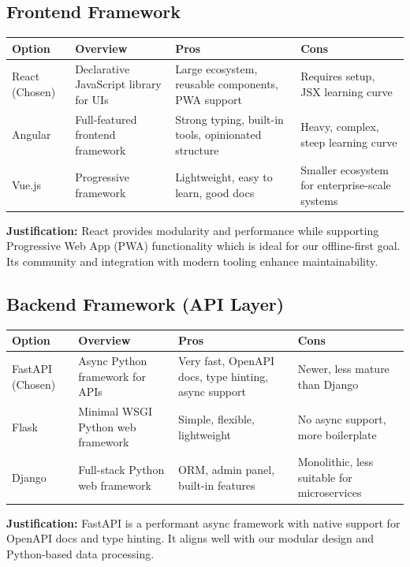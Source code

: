 \documentclass[12pt]{article}
\begin{document}
\subsection*{Frontend Framework}

\begin{tabular}{|p{3cm}|p{4cm}|p{4cm}|p{4cm}|}
\hline
\textbf{Option} & \textbf{Overview} & \textbf{Pros} & \textbf{Cons} \\
\hline
React (Chosen) & Declarative JavaScript library for UIs & Large ecosystem, reusable components, PWA support & Requires setup, JSX learning curve \\
\hline
Angular & Full-featured frontend framework & Strong typing, built-in tools, opinionated structure & Heavy, complex, steep learning curve \\
\hline
Vue.js & Progressive framework & Lightweight, easy to learn, good docs & Smaller ecosystem for enterprise-scale systems \\
\hline
\end{tabular}
\newline
\textbf{Justification:} React provides modularity and performance while supporting Progressive Web App (PWA) functionality which is ideal for our offline-first goal. Its community and integration with modern tooling enhance maintainability.

\subsection*{Backend Framework (API Layer)}

\begin{tabular}{|p{3cm}|p{4cm}|p{4cm}|p{4cm}|}
\hline
\textbf{Option} & \textbf{Overview} & \textbf{Pros} & \textbf{Cons} \\
\hline
FastAPI (Chosen) & Async Python framework for APIs & Very fast, OpenAPI docs, type hinting, async support & Newer, less mature than Django \\
\hline
Flask & Minimal WSGI Python web framework & Simple, flexible, lightweight & No async support, more boilerplate \\
\hline
Django & Full-stack Python web framework & ORM, admin panel, built-in features & Monolithic, less suitable for microservices \\
\hline
\end{tabular}
\newline
\textbf{Justification:} FastAPI is a performant async framework with native support for OpenAPI docs and type hinting. It aligns well with our modular design and Python-based data processing.
\end{document}
